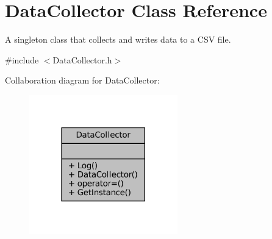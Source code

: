 \hypertarget{classDataCollector}{}\section{Data\+Collector Class Reference}
\label{classDataCollector}


A singleton class that collects and writes data to a C\+SV file.  




{\ttfamily \#include $<$Data\+Collector.\+h$>$}



Collaboration diagram for Data\+Collector\+:\nopagebreak
\begin{figure}[H]
\begin{center}
\leavevmode
\includegraphics[width=182pt]{classDataCollector__coll__graph}
\end{center}
\end{figure}
